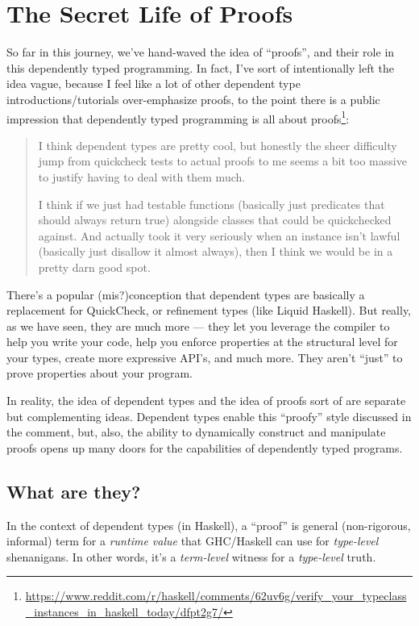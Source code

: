 \documentclass[]{article}
\renewcommand{\href}[2]{#2\footnote{\url{#1}}}
\begin{document}
\section{The Secret Life of Proofs}\label{the-secret-life-of-proofs}

So far in this journey, we've hand-waved the idea of ``proofs'', and their role
in this dependently typed programming. In fact, I've sort of intentionally left
the idea vague, because I feel like a lot of other dependent type
introductions/tutorials over-emphasize proofs, to the point there is a public
impression that
\href{https://www.reddit.com/r/haskell/comments/62uv6g/verify_your_typeclass_instances_in_haskell_today/dfpt2g7/}{dependently
typed programming is all about proofs}:

\begin{quote}
I think dependent types are pretty cool, but honestly the sheer difficulty jump
from quickcheck tests to actual proofs to me seems a bit too massive to justify
having to deal with them much.

I think if we just had testable functions (basically just predicates that should
always return true) alongside classes that could be quickchecked against. And
actually took it very seriously when an instance isn't lawful (basically just
disallow it almost always), then I think we would be in a pretty darn good spot.
\end{quote}

There's a popular (mis?)conception that dependent types are basically a
replacement for QuickCheck, or refinement types (like Liquid Haskell). But
really, as we have seen, they are much more --- they let you leverage the
compiler to help you write your code, help you enforce properties at the
structural level for your types, create more expressive API's, and much more.
They aren't ``just'' to prove properties about your program.

In reality, the idea of dependent types and the idea of proofs sort of are
separate but complementing ideas. Dependent types enable this ``proofy'' style
discussed in the comment, but, also, the ability to dynamically construct and
manipulate proofs opens up many doors for the capabilities of dependently typed
programs.

\subsection{What are they?}\label{what-are-they}

In the context of dependent types (in Haskell), a ``proof'' is general
(non-rigorous, informal) term for a \emph{runtime value} that GHC/Haskell can
use for \emph{type-level} shenanigans. In other words, it's a \emph{term-level}
witness for a \emph{type-level} truth.
\end{document}
